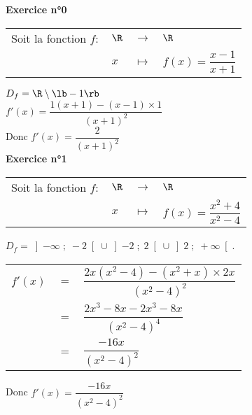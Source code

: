 \textbf{Exercice n°0} \\

\begin{tabular}{llll}
Soit la fonction $f :$ & $\R$ & $\longrightarrow$ & $\R$ \\
& $x$ & $\longmapsto$ & $f(x) = \dfrac{x - 1}{x + 1} $ \\
\end{tabular}

\vspace*{.3cm}

$D_f = \R \setminus \lb -1 \rb $ \\

$f'(x) = \dfrac{1\left(x+1\right) - \left(x-1\right)\times 1}{\left(x+1\right)^2}$ \vspace*{.3cm} \\

Donc $f'(x) = \dfrac{2}{\left(x+1\right)^2}$ \vspace*{.3cm} \\

\textbf{Exercice n°1} \\

\begin{tabular}{llll}
Soit la fonction $f :$ & $\R$ & $\longrightarrow$ & $\R$ \\
& $x$ & $\longmapsto$ & $f(x) = \dfrac{x^2 + 4 }{x^2 - 4} $ \\
\end{tabular}

$D_f = \left]-\infty \; ; \; -2\right[\cup \left]-2 \; ; \; 2\right[\cup \left]2 \; ; \; +\infty\right[$. \\

\begin{tabular}{lll}
$ f'(x)$ & $=$ & $\dfrac{2x\left(x^2 - 4\right)- \left(x^2 + x\right) \times 2x}{\left(x^2 -4\right)^2}$ \vspace*{.3cm} \\
& $=$ & $\dfrac{2x^3 - 8x - 2x^3 -8x}{\left(x^2 -4\right)^4}$ \vspace*{.3cm} \\
& $=$ & $\dfrac{-16x}{\left(x^2 - 4\right)^2}$ \\
\end{tabular}

\vspace*{.3cm}

Donc $f'(x) = \dfrac{-16x}{\left(x^2 - 4\right)^2}$ \vspace*{.3cm} \\

